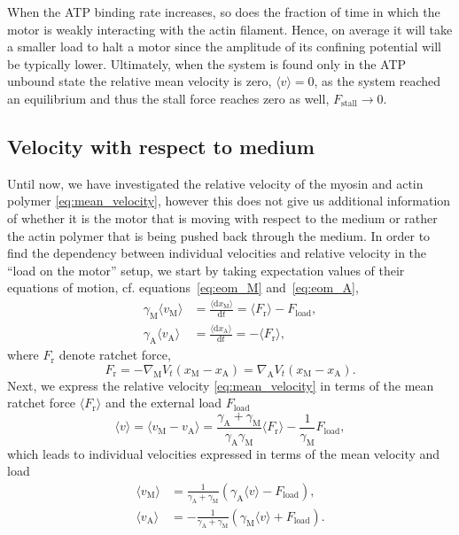 \documentclass[aps,pre,twocolumn,showpacs,showkeys,superscriptaddress,floatfix]{revtex4-1}
\newcommand{\rmd}{{\mathrm d}}
\begin{document}
When the ATP binding rate increases, so does the fraction of time in which the motor is weakly interacting with the actin filament. 
Hence, on average it will take a smaller load to halt a motor since the amplitude of its confining potential will be typically lower.
Ultimately, when the system is found only in the ATP unbound state the relative mean velocity is zero, $\langle v \rangle = 0$, as the system reached an equilibrium 
and thus the stall force reaches zero as well, $F_\text{stall} \to 0$.

\subsection{Velocity with respect to medium}
\label{sec:ind_velo}
Until now, we have investigated the relative velocity of the myosin and actin polymer \eqref{eq:mean_velocity}, however this does not give us additional information of
whether it is the motor that is moving with respect to the medium or rather the actin polymer that is being pushed back through the medium.
In order to find the dependency between individual velocities and relative velocity in the ``load on the motor'' setup, 
we start by taking expectation values of their equations of motion, cf. equations~\eqref{eq:eom_M} and~\eqref{eq:eom_A},
\begin{align}
\gamma_\text{M} \langle v_\text{M} \rangle &= \frac{ \langle \rmd x_\text{M} \rangle }{\rmd t} = \langle F_\text{r} \rangle - F_\text{load} , 
\label{eq:pre_velocity_M} 
\\
\gamma_\text{A} \langle v_\text{A} \rangle &= \frac{ \langle \rmd x_\text{A} \rangle }{\rmd t} = -\langle F_\text{r} \rangle , 
\label{eq:pre_velocity_A}
\end{align}
where $F_\text{r}$ denote ratchet force, 
\begin{equation}
F_\text{r} = - \nabla_\text{M} V_t( x_\text{M} - x_\text{A} ) = \nabla_\text{A} V_t(x_\text{M} - x_\text{A} ) . 
\label{eq:ratchet_force}
\end{equation}
Next, we express the relative velocity \eqref{eq:mean_velocity} in terms of the mean ratchet force $\langle F_\text{r} \rangle$ and the external load $F_\text{load}$  
\begin{equation}
\langle v \rangle 
= \langle v_\text{M} - v_\text{A} \rangle 
= \frac{\gamma_\text{A} + \gamma_\text{M}}{\gamma_\text{A} \gamma_\text{M}} \langle F_\text{r} \rangle - \frac{1}{\gamma_\text{M}} F_\text{load} ,
\label{eq:mean_velocity_Fr_Fl}
\end{equation}
which leads to individual velocities expressed in terms of the mean velocity and load 
\begin{align}
\langle v_\text{M} \rangle &= \frac{1}{ \gamma_\text{A} + \gamma_\text{M} } \left( \gamma_\text{A} \langle v \rangle - F_\text{load} \right) ,
\label{eq:velocity_M} \\
\langle v_\text{A} \rangle &= -\frac{1}{ \gamma_\text{A} + \gamma_\text{M} } \left( \gamma_\text{M} \langle v \rangle + F_\text{load} \right) .
\label{eq:velocity_A}
\end{align}
\end{document}
